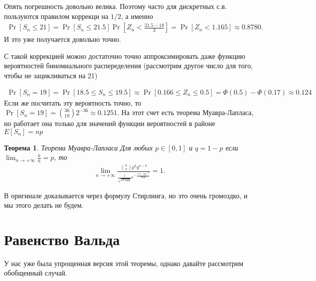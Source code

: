 \documentclass[12pt]{article}
\newtheorem{theorem}{Теорема}
\begin{document}
Опять погрешность довольно велика. Поэтому часто для дискретных с.в. пользуются правилом коррекци на $1/2$, а именно
\begin{align*}
  \Pr[S_n \le 21] = \Pr[S_n \le 21.5]\Pr\left[Z_n < \frac{21.5 - 18}{3}\right] = \Pr[Z_n < 1.165] \approx 0.8780.
\end{align*}
И это уже получается довольно точно.

С такой коррекцией можно достаточно точно аппроксимировать даже функцию вероятностей биномиального распеределения (рассмотрим другое число для того, чтобы не зацикливаться на 21)

\begin{align*}
  \Pr[S_n = 19] = \Pr[18.5 \le S_n \le 19.5] \approx \Pr[0.166 \le Z_n \le 0.5] = \Phi(0.5) - \Phi(0.17) \approx 0.124
\end{align*}
Если же посчитать эту вероятность точно, то $\Pr[S_n = 19] = \binom{36}{19} 2^{-36} \approx 0.1251$. На этот счет есть теорема Муавра-Лапласа, но работает она только для значений функции вероятностей в районе $E[S_n] = np$

\begin{theorem}{Теорема Муавра-Лапласа}
  Для любых $p \in [0, 1]$ и $q = 1 - p$ если $\lim_{n \to +\infty} \frac{k}{n} = p$, то   
  \begin{align*}
    \lim_{n \to +\infty} \frac{\binom{n}{k}p^kq^{n - k}}{\frac{1}{\sqrt{2\pi npq}} e^{-\frac{(k - np)^2}{2npq}}} = 1.
  \end{align*}
\end{theorem}

В оригинале доказывается через формулу Стирлинга, но это очень громоздко, и мы этого делать не будем.

\section{Равенство Вальда}

У нас уже была упрощенная версия этой теоремы, однако давайте рассмотрим обобщенный случай.
\end{document}
